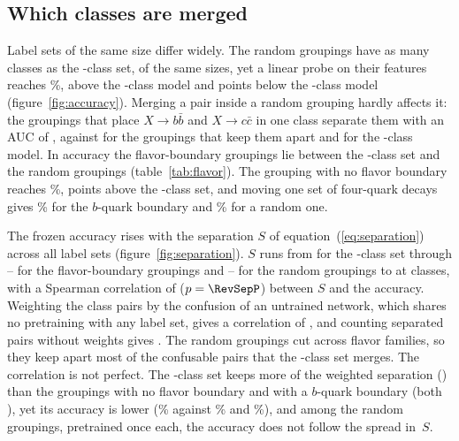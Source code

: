 \subsection{Which classes are merged}\label{sec:which}

Label sets of the same size differ widely.
The random groupings have as many classes as the \Kcoarse-class set, of the same sizes, yet a linear probe on their
features reaches \VLpJcTwoRand\%, above the \Kmid-class model and \VDLpJcTwoRand{} points below the \Kfull-class model
(figure~\ref{fig:accuracy}).
Merging a pair inside a random grouping hardly affects it: the groupings that place $X\to b\bar b$ and $X\to c\bar c$ in
one class separate them with an AUC of \VAucBbRandMerged, against \VAucBbRandApart{} for the groupings that keep them
apart and \VAucBbCoarse{} for the \Kcoarse-class model.
In accuracy the flavor-boundary groupings lie between the \Kcoarse-class set and the random groupings
(table~\ref{tab:flavor}).
The grouping with no flavor boundary reaches \VLpJcTwoFlavZero\%, \VDLpJcTwoFlavZero{} points above the \Kcoarse-class
set, and moving one set of four-quark decays gives \VLpJcTwoFlavOne\% for the $b$-quark boundary and \VLpJcTwoFlavOneR\%
for a random one.

The frozen accuracy rises with the separation $S$ of equation~(\ref{eq:separation}) across all \VSepNWord{} label sets
(figure~\ref{fig:separation}).
$S$ runs from \VSepCoarse{} for the \Kcoarse-class set through \VSepFlavZero--\VSepFlavOneR{} for the flavor-boundary
groupings and \VSepRandLo--\VSepRandHi{} for the random groupings to \VSepRes{} at \Kres{} classes, with a Spearman
correlation of \RevSepRho{} ($p=\RevSepP$) between $S$ and the accuracy.
Weighting the class pairs by the confusion of an untrained network, which shares no pretraining with any label set,
gives a correlation of \RevSepUntrainedRho, and counting separated pairs without weights gives \RevSepNaiveRho.
The random groupings cut across flavor families, so they keep apart most of the confusable pairs that the
\Kcoarse-class set merges.
The correlation is not perfect.
The \Kmid-class set keeps more of the weighted separation (\VSepMid) than the groupings with no flavor boundary and with a
$b$-quark boundary (both \VSepFlavZero), yet its accuracy is lower (\VLpJcTwoMid\% against \VLpJcTwoFlavZero\% and
\VLpJcTwoFlavOne\%), and among the random groupings, pretrained once each, the accuracy does not follow the spread
in~$S$.

